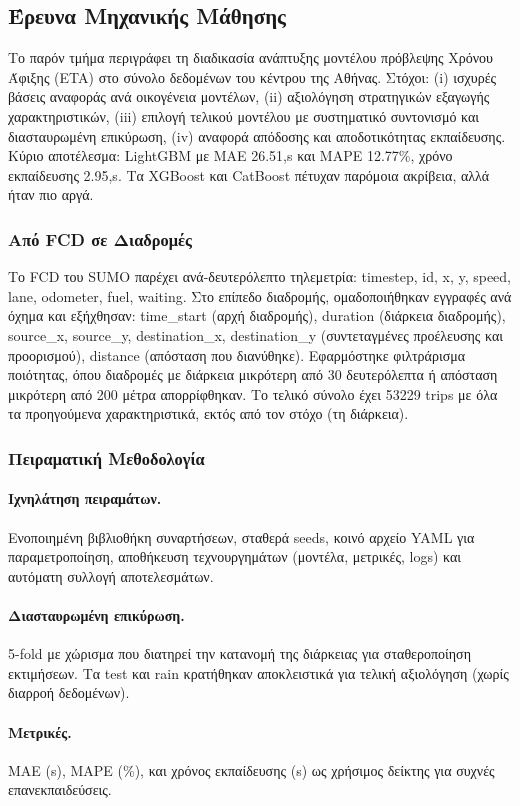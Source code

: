 \subsection*{Έρευνα Μηχανικής Μάθησης}
Το παρόν τμήμα περιγράφει τη διαδικασία ανάπτυξης μοντέλου πρόβλεψης Χρόνου Άφιξης (ETA) στο σύνολο δεδομένων του κέντρου της Αθήνας.
Στόχοι: (i) ισχυρές βάσεις αναφοράς ανά οικογένεια μοντέλων, (ii) αξιολόγηση στρατηγικών εξαγωγής χαρακτηριστικών, (iii) επιλογή τελικού μοντέλου με συστηματικό συντονισμό και διασταυρωμένη επικύρωση, (iv) αναφορά απόδοσης και αποδοτικότητας εκπαίδευσης.
Κύριο αποτέλεσμα: LightGBM με MAE 26.51,s και MAPE 12.77\%, χρόνο εκπαίδευσης 2.95,s. Τα XGBoost και CatBoost πέτυχαν παρόμοια ακρίβεια, αλλά ήταν πιο αργά.

\subsubsection*{Από FCD σε Διαδρομές}
Το FCD του SUMO παρέχει ανά-δευτερόλεπτο τηλεμετρία: timestep, id, x, y, speed, lane, odometer, fuel, waiting.
Στο επίπεδο διαδρομής, ομαδοποιήθηκαν εγγραφές ανά όχημα και εξήχθησαν: time\_start (αρχή διαδρομής), duration (διάρκεια διαδρομής), source\_x, source\_y, destination\_x, destination\_y (συντεταγμένες προέλευσης και προορισμού), distance (απόσταση που διανύθηκε).
Εφαρμόστηκε φιλτράρισμα ποιότητας, όπου διαδρομές με διάρκεια μικρότερη από 30 δευτερόλεπτα ή απόσταση μικρότερη από 200 μέτρα απορρίφθηκαν.
Το τελικό σύνολο έχει 53229 trips με όλα τα προηγούμενα χαρακτηριστικά, εκτός από τον στόχο (τη διάρκεια).

\subsubsection*{Πειραματική Μεθοδολογία}
\paragraph*{Ιχνηλάτηση πειραμάτων.} Ενοποιημένη βιβλιοθήκη συναρτήσεων, σταθερά seeds, κοινό αρχείο YAML για παραμετροποίηση, αποθήκευση τεχνουργημάτων (μοντέλα, μετρικές, logs) και αυτόματη συλλογή αποτελεσμάτων.
\paragraph*{Διασταυρωμένη επικύρωση.} 5-fold με χώρισμα που διατηρεί την κατανομή της διάρκειας για σταθεροποίηση εκτιμήσεων. Τα test και rain κρατήθηκαν αποκλειστικά για τελική αξιολόγηση (χωρίς διαρροή δεδομένων).
\paragraph*{Μετρικές.} MAE (s), MAPE (\%), και χρόνος εκπαίδευσης (s) ως χρήσιμος δείκτης για συχνές επανεκπαιδεύσεις.

